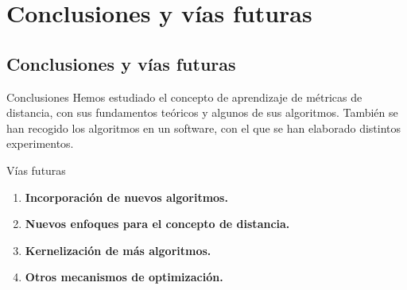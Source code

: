 \documentclass[10pt, compress]{beamer}
\begin{document}
\section{Conclusiones y vías futuras}

\subsection{Conclusiones y vías futuras}

\begin{frame}{Conclusiones}
  Hemos estudiado el concepto de aprendizaje de métricas de distancia, con sus fundamentos teóricos y algunos de sus algoritmos. También se han recogido los algoritmos en un software, con el que se han elaborado distintos experimentos.
  \begin{block}{Vías futuras}
    \begin{enumerate}
      \item \textbf{Incorporación de nuevos algoritmos.}
      \item \textbf{Nuevos enfoques para el concepto de distancia.}
      \item \textbf{Kernelización de más algoritmos.}
      \item \textbf{Otros mecanismos de optimización.}
    \end{enumerate}
  \end{block}
\end{frame}
\end{document}

